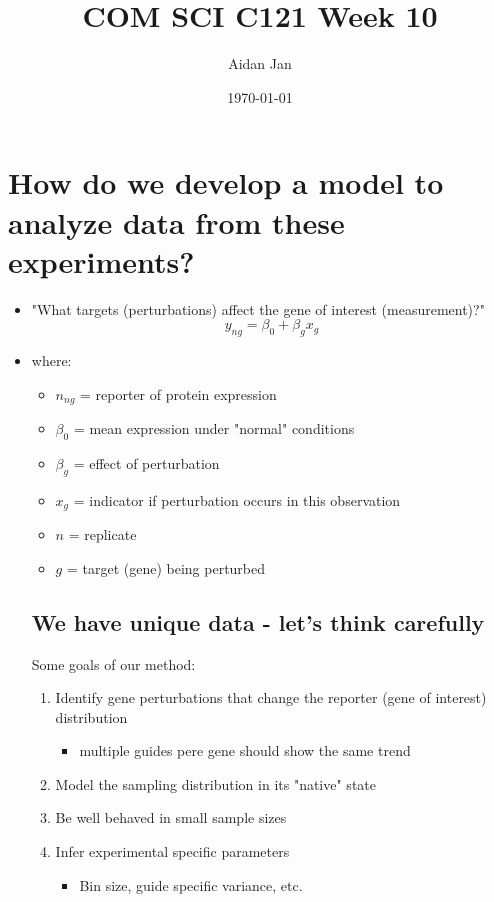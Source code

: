 \documentclass[10pt]{article}
\title{COM SCI C121 Week 10}
\author{Aidan Jan}
\date{\today}
\begin{document}
\maketitle

\section*{How do we develop a model to analyze data from these experiments?}
\begin{itemize}
    \item "What targets (perturbations) affect the gene of interest (measurement)?"
    \[y_{ng} = \beta_0 + \beta_g x_g\]
    \item where:
    \begin{itemize}
        \item $n_{ng}$ = reporter of protein expression
        \item $\beta_0$ = mean expression under "normal" conditions
        \item $\beta_g$ = effect of perturbation
        \item $x_g$ = indicator if perturbation occurs in this observation
        \item $n$ = replicate
        \item $g$ = target (gene) being perturbed
    \end{itemize}

\subsection*{We have unique data - let's think carefully}
Some goals of our method:
\begin{enumerate}
    \item Identify gene perturbations that change the reporter (gene of interest) distribution
    \begin{itemize}
        \item multiple guides pere gene should show the same trend
    \end{itemize}
    \item Model the sampling distribution in its "native" state
    \item Be well behaved in small sample sizes
    \item Infer experimental specific parameters
    \begin{itemize}
        \item Bin size, guide specific variance, etc.
    \end{itemize}
\end{enumerate}
\end{itemize}
\end{document}
